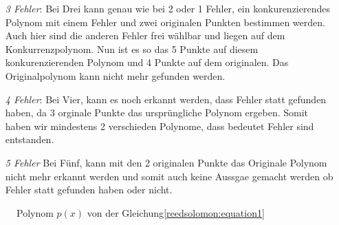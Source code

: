 \begin{beispiel}
\begin{itemize}
        Da der zweite \textcolor{red}{Fehler} frei wählbar ist, kann dieser auch auf dem \textcolor{gray}{Konkurrenzpolynom} liegen, wie in der Abbilbung \ref{fig:polynom}.
        Nun haben wir, ein \textcolor{blue}{originales Polynom} mit \textcolor{darkgreen}{5} übereinstimmenden und eine konkurrenzierendes mit 4 Punkten.
        Da 5 noch grösser als 4 ist, können wir sagen, welches das Originalpolynom ist.
    \item[\textit{3 Fehler}:] Bei Drei kann genau wie bei 2 oder 1 Fehler, ein konkurenzierendes Polynom mit einem Fehler und zwei originalen Punkten bestimmen werden.
        Auch hier sind die anderen Fehler frei wählbar und liegen auf dem Konkurrenzpolynom.
        Nun ist es so das 5 Punkte auf diesem konkurenzierenden Polynom und 4 Punkte auf dem originalen.
        Das Originalpolynom kann nicht mehr gefunden werden.
    \item[\textit{4 Fehler}:] Bei Vier, kann es noch erkannt werden, dass Fehler statt gefunden haben, da 3 orginale Punkte das ursprüngliche Polynom ergeben.
        Somit haben wir mindestens 2 verschieden Polynome, dass bedeutet Fehler sind entstanden.
    \item[\textit{5 Fehler}] Bei Fünf, kann mit den 2 originalen Punkte das Originale Polynom nicht mehr erkannt werden und 
        somit auch keine Aussgae gemacht werden ob Fehler statt gefunden haben oder nicht.
\end{itemize}

\begin{figure}%
	\centering
    
	\caption{Polynom $p(x)$ von der Gleichung\eqref{reedsolomon:equation1}}
	\label{fig:polynom}
\end{figure}
\qedhere
\end{beispiel}

